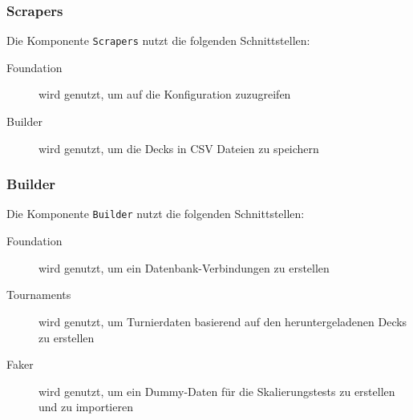 \subsubsection*{Scrapers}
Die Komponente \verb|Scrapers| nutzt die folgenden Schnittstellen:
\begin{description}
    \item[Foundation] wird genutzt, um auf die Konfiguration zuzugreifen
    \item[Builder] wird genutzt, um die Decks in \ac{CSV} Dateien zu speichern
\end{description}

\subsubsection*{Builder}
Die Komponente \verb|Builder| nutzt die folgenden Schnittstellen:
\begin{description}
    \item[Foundation] wird genutzt, um ein Datenbank-Verbindungen zu erstellen
    \item[Tournaments] wird genutzt, um Turnierdaten basierend auf den heruntergeladenen Decks zu erstellen
    \item[Faker] wird genutzt, um ein Dummy-Daten für die Skalierungstests zu erstellen und zu importieren
\end{description}

